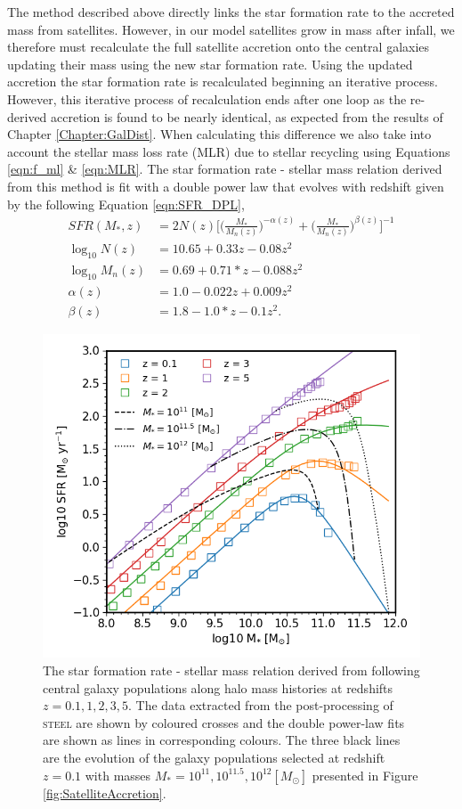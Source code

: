 The method described above directly links the star formation rate to the accreted mass from satellites. However, in our model satellites grow in mass after infall, we therefore must recalculate the full satellite accretion onto the central galaxies updating their mass using the new star formation rate. Using the updated accretion the star formation rate is recalculated beginning an iterative process. However, this iterative process of recalculation ends after one loop as the re-derived accretion is found to be nearly identical, as expected from the results of Chapter \ref{Chapter:GalDist}. When calculating this difference we also take into account the stellar mass loss rate (MLR) due to stellar recycling using Equations \ref{eqn:f_ml} \& \ref{eqn:MLR}. The star formation rate - stellar mass relation derived from this method is fit with a double power law that evolves with redshift given by the following Equation \ref{eqn:SFR_DPL},
\begin{equation}
\label{eqn:SFR_DPL}
\begin{split}
SFR(M_*, z) &= 2N(z)\Big[ \Big( \frac{M_*}{M_{n}(z)}\Big) ^{- \alpha(z)} + \Big( \frac{M_*}{M_{n}(z)}\Big)^{\beta(z)} \Big ]^{-1}\\
\log_{10} N(z) &= 10.65 + 0.33z - 0.08z^2\\
\log_{10} M_{n}(z) &= 0.69 + 0.71*z - 0.088z^2\\
\alpha(z) &= 1.0 - 0.022z + 0.009z^2\\
\beta(z) &= 1.8 - 1.0*z - 0.1z^2.
\end{split}
\end{equation}

\begin{figure}[h]
	\centering
	\includegraphics[width = 0.8\linewidth]{Figures/Chapter4/HMC_DPL.png}
    \caption{The star formation rate - stellar mass relation derived from following central galaxy populations along halo mass histories at redshifts $z = 0.1, 1, 2, 3, 5$. The data extracted from the post-processing of \textsc{steel} are shown by coloured crosses and the double power-law fits are shown as lines in corresponding colours. The three black lines are the evolution of the galaxy populations selected at redshift $z=0.1$ with masses $M_* = 10^{11}, 10^{11.5}, 10^{12} [M_{\odot}]$  presented in Figure \ref{fig:SatelliteAccretion}.}
	\label{fig:SFR_DPL}
\end{figure}


